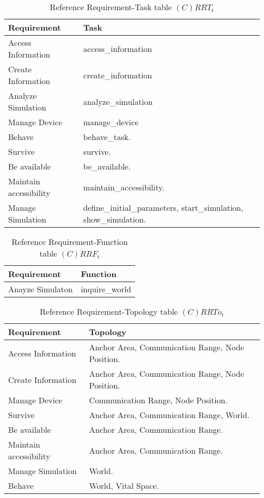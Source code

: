 \begin{table}[H]
	\centering
	\begin{tabular}{|p{4cm}|p{8cm}|}
			\hline
			\textbf{Requirement} & \textbf{Task} \\
			\hline
			Access Information & access\_information \\
			\hline
			Create Information & create\_information \\
			\hline
			Analyze Simulation & analyze\_simulation \\
			\hline
			Manage Device & manage\_device \\
			\hline
			Behave & behave\_task. \\
			\hline
			Survive & survive. \\
			\hline
			Be available & be\_available. \\
			\hline
			Maintain accessibility & maintain\_accessibility. \\
			\hline
			Manage Simulation & define\_initial\_parameters, start\_simulation, show\_simulation. \\
			\hline
		\end{tabular}
	\caption{Reference Requirement-Task table $(C)RRT_t$}
	\label{tab:crrtt}
\end{table}

\begin{table}[H]
	\centering
	\begin{tabular}{|p{4cm}|p{8cm}|}
			\hline
			\textbf{Requirement} & \textbf{Function} \\
			\hline
			Anayze Simulaton & inquire\_world \\
			\hline
		\end{tabular}
	\caption{Reference Requirement-Function table $(C)RRF_t$}
	\label{tab:crrft}
\end{table}

\begin{table}[H]
	\centering
	\begin{tabular}{|p{4cm}|p{8cm}|}
			\hline
			\textbf{Requirement} & \textbf{Topology} \\
			\hline
			Access Information & Anchor Area, Communication Range, Node Position. \\
			\hline
			Create Information & Anchor Area, Communication Range, Node Position. \\
			\hline
			Manage Device & Communication Range, Node Position. \\
			\hline
			Survive & Anchor Area, Communication Range, World. \\
			\hline
			Be available & Anchor Area, Communication Range. \\
			\hline
			Maintain accessibility & Anchor Area, Communication Range. \\
			\hline
			Manage Simulation & World. \\
			\hline
			Behave & World, Vital Space. \\
			\hline
		\end{tabular}
	\caption{Reference Requirement-Topology table $(C)RRTo_t$}
	\label{tab:crrtot}
\end{table}

